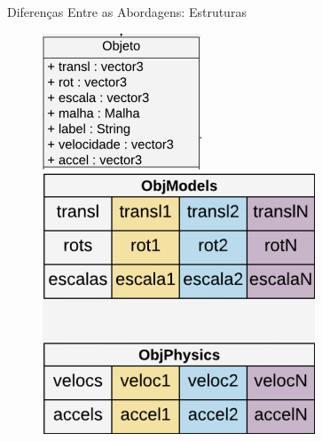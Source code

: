 \documentclass{beamer}
\begin{document}
\begin{frame}{Diferenças Entre as Abordagens: Estruturas}
    \begin{figure}
    \centering
        \begin{minipage}[b]{0.35\textwidth}
            \includegraphics[width=\textwidth]{figuras/objectood}
        \end{minipage}
        \hspace{1.5cm}
        \begin{minipage}[b]{0.35\textwidth}
            \includegraphics[width=\textwidth]{figuras/objectdod}
        \end{minipage}
    \end{figure}
\end{frame}
\end{document}
